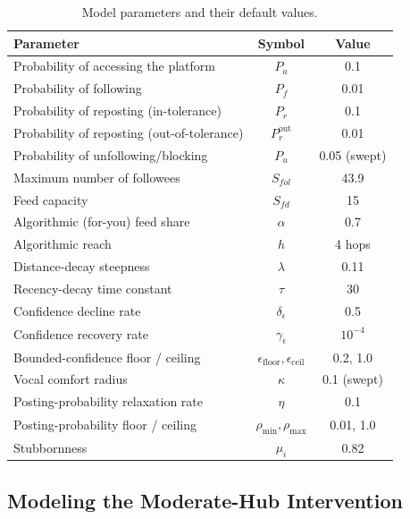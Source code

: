 \documentclass{svproc}
\begin{document}
\begin{table}[t]
\centering
\caption{Model parameters and their default values.}\label{tab:param}
\small
\begin{tabular}{lcc}
\toprule
Parameter & Symbol & Value \\
\midrule
Probability of accessing the platform & $P_a$ & 0.1 \\
Probability of following & $P_f$ & 0.01 \\
Probability of reposting (in-tolerance) & $P_r$ & 0.1 \\
Probability of reposting (out-of-tolerance) & $P_r^{\mathrm{out}}$ & 0.01 \\
Probability of unfollowing/blocking & $P_u$ & 0.05 (swept) \\
Maximum number of followees & $S_{fol}$ & 43.9 \\
Feed capacity & $S_{fd}$ & 15 \\
Algorithmic (for-you) feed share & $\alpha$ & 0.7 \\
Algorithmic reach & $h$ & 4 hops \\
Distance-decay steepness & $\lambda$ & 0.11 \\
Recency-decay time constant & $\tau$ & 30 \\
Confidence decline rate & $\delta_\epsilon$ & 0.5 \\
Confidence recovery rate & $\gamma_\epsilon$ & $10^{-4}$ \\
Bounded-confidence floor / ceiling & $\epsilon_{\mathrm{floor}},\epsilon_{\mathrm{ceil}}$ & 0.2, 1.0 \\
Vocal comfort radius & $\kappa$ & 0.1 (swept) \\
Posting-probability relaxation rate & $\eta$ & 0.1 \\
Posting-probability floor / ceiling & $\rho_{\min},\rho_{\max}$ & 0.01, 1.0 \\
Stubbornness & $\mu_i$ & 0.82 \\
\bottomrule
\end{tabular}
\end{table}

\subsection{Modeling the Moderate-Hub Intervention}\label{sec:model-intervention}
\end{document}
